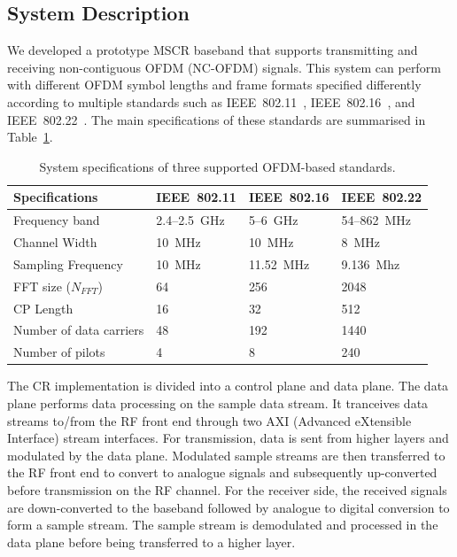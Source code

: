 \subsection{System Description}

We developed a prototype MSCR baseband that supports transmitting and receiving non-contiguous OFDM (NC-OFDM) signals.
This system can perform with different OFDM symbol lengths and frame formats specified differently according to multiple standards such as IEEE~802.11~\cite{IEEE80211}, IEEE~802.16~\cite{IEEE80216}, and IEEE~802.22~\cite{IEEE80222}.
The main specifications of these standards are summarised in Table~\ref{Tab:spec}.

\begin{table}[h]
\label{Tab:spec}
\centering
\caption{System specifications of three supported OFDM-based standards.}{
\renewcommand{\arraystretch}{1.3}
\begin{tabular}{@{}llll@{}}
\toprule
Specifications 			& IEEE~802.11 				& IEEE~802.16				& IEEE~802.22 		\\ \midrule
Frequency band			& 2.4--2.5~GHz				& 5--6~GHz					& 54--862~MHz		\\
Channel Width			& 10~MHz					& 10~MHz					& 8~MHz			\\
Sampling Frequency		& 10~MHz					& 11.52~MHz				& 9.136~Mhz		\\
FFT size ($N_{FFT}$)		& 64						& 256						& 2048			\\
CP Length				& 16						& 32						& 512				\\
Number of data carriers		& 48						& 192						& 1440			\\
Number of pilots			& 4						& 8						& 240				\\
\end{tabular}
}
\end{table}

The CR implementation is divided into a control plane and data plane.
The data plane performs data processing on the sample data stream.
It tranceives data streams to/from the RF front end through two AXI (Advanced eXtensible Interface) stream interfaces.
For transmission, data is sent from higher layers and modulated by the data plane.
Modulated sample streams are then transferred to the RF front end to convert to analogue signals and subsequently up-converted before transmission on the RF channel.
For the receiver side, the received signals are down-converted to the baseband followed by analogue to digital conversion to form a sample stream.
The sample stream is demodulated and processed in the data plane before being transferred to a higher layer.

